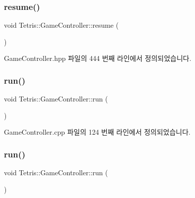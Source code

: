 \subsubsection{\texorpdfstring{resume()}{resume()}\hspace{0.1cm}{\footnotesize\ttfamily [2/2]}}
{\footnotesize\ttfamily void Tetris\+::\+Game\+Controller\+::resume (\begin{DoxyParamCaption}{ }\end{DoxyParamCaption})\hspace{0.3cm}{\ttfamily [inline]}}



Game\+Controller.\+hpp 파일의 444 번째 라인에서 정의되었습니다.

\mbox{\label{class_tetris_1_1_game_controller_a49446695e3ba0ff829f20beaeecac6da}} 
\subsubsection{\texorpdfstring{run()}{run()}\hspace{0.1cm}{\footnotesize\ttfamily [1/2]}}
{\footnotesize\ttfamily void Tetris\+::\+Game\+Controller\+::run (\begin{DoxyParamCaption}{ }\end{DoxyParamCaption})}



Game\+Controller.\+cpp 파일의 124 번째 라인에서 정의되었습니다.

\mbox{\label{class_tetris_1_1_game_controller_a49446695e3ba0ff829f20beaeecac6da}} 
\subsubsection{\texorpdfstring{run()}{run()}\hspace{0.1cm}{\footnotesize\ttfamily [2/2]}}
{\footnotesize\ttfamily void Tetris\+::\+Game\+Controller\+::run (\begin{DoxyParamCaption}{ }\end{DoxyParamCaption})\hspace{0.3cm}{\ttfamily [inline]}}



